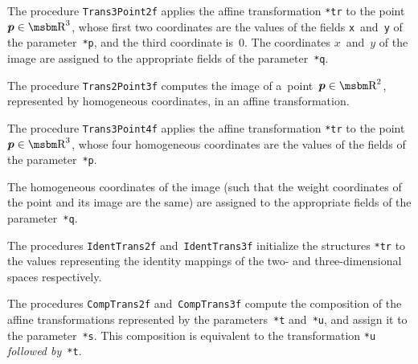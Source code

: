 \vspace{\bigskipamount}
The procedure \texttt{Trans3Point2f} applies the affine transformation
\texttt{*tr} to the point $\bm{p}\in\R^3$, whose first two coordinates are
the values of the fields \texttt{x}~and~\texttt{y} of the parameter~\texttt{*p},
and the third coordinate is~$0$.
The coordinates $x$~and~$y$ of the image are assigned to the appropriate fields
of the parameter~\texttt{*q}.

\vspace{\bigskipamount}
The procedure \texttt{Trans2Point3f} computes the image of
a~point~$\bm{p}\in\R^2$, represented by homogeneous coordinates,
in an affine transformation.

\vspace{\bigskipamount}
The procedure \texttt{Trans3Point4f} applies the affine transformation
\texttt{*tr} to the point~$\bm{p}\in\R^3$, whose four homogeneous coordinates
are the values of the fields of the parameter~\texttt{*p}.

The homogeneous coordinates of the image (such that the weight
coordinates of the point and its image are the same) are assigned to
the appropriate fields of the parameter~\texttt{*q}.

\vspace{\bigskipamount}
The procedures \texttt{IdentTrans2f} and~\texttt{IdentTrans3f} initialize
the structures \texttt{*tr} to the values representing the identity mappings
of the two- and three-dimensional spaces respectively.

\vspace{\bigskipamount}
The procedures \texttt{CompTrans2f} and~\texttt{CompTrans3f} compute
the composition of the affine transformations represented by the
parameters~\texttt{*t} and~\texttt{*u}, and assign it to the
parameter~\texttt{*s}. This composition is equivalent to the transformation
\texttt{*u} \emph{followed by}~\texttt{*t}.


